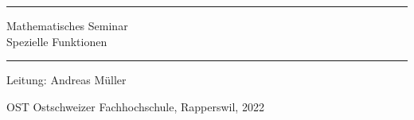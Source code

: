 %
%
\pagestyle{fancy}
\frontmatter
\newcommand\HRule{\noindent\rule{\linewidth}{1.5pt}}
\begin{titlepage}
\HRule
\vspace*{5pt}
\begin{flushright}
{
\LARGE
Mathematisches Seminar\\
\vspace*{20pt}
\Huge
Spezielle Funktionen%
}%
\vspace*{5pt}
\end{flushright}
\HRule
\begin{flushright}
\vspace{60pt}
\Large
Leitung: Andreas Müller\\
\vspace{40pt}
\Large

\end{flushright}
\begin{center}
OST Ostschweizer Fachhochschule, Rapperswil, 2022
\end{center}
\end{titlepage}
